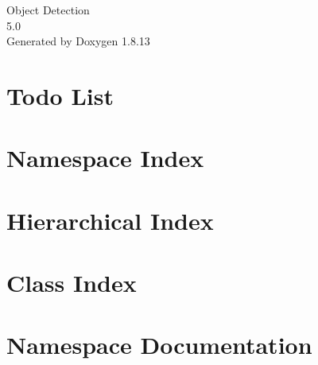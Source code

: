 \documentclass[twoside]{book}
\newcommand{\+}{\discretionary{\mbox{\scriptsize$\hookleftarrow$}}{}{}}
\newcommand{\clearemptydoublepage}{%
  \newpage{\pagestyle{empty}\cleardoublepage}%
}
\begin{document}
\hypersetup{pageanchor=false,
             bookmarksnumbered=true,
             pdfencoding=unicode
            }
\begin{titlepage}
\vspace*{7cm}
\begin{center}%
{\Large Object Detection \\[1ex]\large 5.\+0 }\\
\vspace*{1cm}
{\large Generated by Doxygen 1.8.13}\\
\end{center}
\end{titlepage}
\clearemptydoublepage
{}
\tableofcontents
\clearemptydoublepage
{}
\hypersetup{pageanchor=true}

\chapter{Todo List}
\label{todo}

\chapter{Namespace Index}

\chapter{Hierarchical Index}

\chapter{Class Index}

\chapter{Namespace Documentation}


\end{document}
